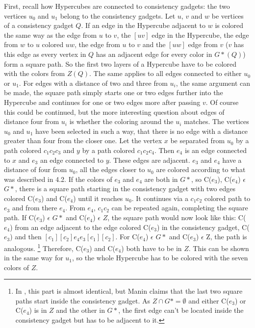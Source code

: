 \documentclass[12pt,a4paper]{article}
\begin{document}
First, recall how Hypercubes are connected to consistency gadgets: the two vertices $u_0$ and $u_1$ belong to the consistency gadgets. Let $u$, $v$ and $w$ be vertices of a consistency gadget $Q$. If an edge in the Hypercube adjacent to $w$ is colored the same way as the edge from $u$ to $v$, the $[uv]$ edge in the Hypercube, the edge from $w$ to $u$ colored $uw$, the edge from $u$ to $v$ and the $[uw]$ edge from $v$ ($v$ has this edge as every vertex in $Q$ has an adjacent edge for every color in $G*(Q)$) form a square path. So the first two layers of a Hypercube have to be colored with the colors from $Z(Q)$. The same applies to all edges connected to either $u_0$ or $u_1$. For edges with a distance of two and three from $u_i$, the same argument can be made, the square path simply starts one or two edges further into the Hypercube and continues for one or two edges more after passing $v$. Of course this could be continued, but the more interesting question about edges of distance four from $u_i$ is whether the coloring around the $u_i$ matches. The vertices $u_0$ and $u_1$ have been selected in such a way, that there is no edge with a distance greater than four from the closer one. Let the vertex $x$ be separated from $u_0$ by a path colored $c_1c_2c_3$ and $y$ by a path colored $c_1c_2c_4$. Then $e_4$ is an edge connected to $x$ and $e_3$ an edge connected to $y$. These edges are adjacent. $e_3$ and $e_4$ have a distance of four from $u_0$, all the edges closer to $u_0$ are colored according to what was described in 4.2. If the colors of $e_3$ and $e_4$ are both in $G*$, so C($e_3$), C($e_4$) $\epsilon$ $G*$, there is a square path starting in the consistency gadget with two edges colored C($e_3$) and C($e_4$) until it reaches $u_0$. It continues via a $c_1c_2$ colored path to $e_3$ and from there $e_4$. From $e_4$, $c_1c_2$ can be repeated again, completing the square path. If C($e_3$) $\epsilon$ $G*$ and C($e_4$) $\epsilon$ $Z$, the square path would now look like this: C($e_4$) from an edge adjacent to the edge colored C($e_3$) in the consistency gadget, C($e_3$) and then $[c_1][c_2]e_4e_3[c_1][c_2]$. For C($e_4$) $\epsilon$ $G*$ and C($e_3$) $\epsilon$ Z, the path is analogous. \footnote{In \citep{Manin2008}, this part is almost identical, but Manin claims that the last two square paths start inside the consistency gadget. As $Z \cap G* = \emptyset$ and either C($e_3$) or C($e_4$) is in $Z$ and the other in $G*$, the first edge can't be located inside the consistency gadget but has to be adjacent to it.} Therefore, C($e_3$) and C($e_4$) both have to be in $Z$. This can be shown in the same way for $u_1$, so the whole Hypercube has to be colored with the seven colors of $Z$. 
\end{document}
